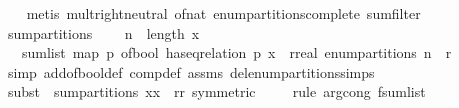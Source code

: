 \begin{isabellebody}
%
\isadelimproof
\ \ %
\endisadelimproof
%
\isatagproof
{}\isamarkupfalse%
\ {\isacharparenleft}{\kern0pt}metis\ mult{\isachardot}{\kern0pt}right{\isacharunderscore}{\kern0pt}neutral\ of{\isacharunderscore}{\kern0pt}nat{\isacharunderscore}{\kern0pt}{}\ enum{\isacharunderscore}{\kern0pt}partitions{\isacharunderscore}{\kern0pt}complete\ sum{\isacharunderscore}{\kern0pt}filter{\isacharparenright}{\kern0pt}%
\endisatagproof
{\isafoldproof}%
%
\isadelimproof
\isanewline
%
\endisadelimproof
\isanewline
{}\isamarkupfalse%
\ sum{\isacharunderscore}{\kern0pt}partitions{\isacharprime}{\kern0pt}{\isacharcolon}{\kern0pt}\ \isanewline
\ \ \ {\isachardoublequoteopen}n\ {\isacharequal}{\kern0pt}\ length\ x{\isachardoublequoteclose}\isanewline
\ \ \ {\isachardoublequoteopen}sum{\isacharunderscore}{\kern0pt}list\ {\isacharparenleft}{\kern0pt}map\ {\isacharparenleft}{\kern0pt}{\isasymlambda}p{\isachardot}{\kern0pt}\ of{\isacharunderscore}{\kern0pt}bool\ {\isacharparenleft}{\kern0pt}has{\isacharunderscore}{\kern0pt}eq{\isacharunderscore}{\kern0pt}relation\ p\ x{\isacharparenright}{\kern0pt}\ {\isacharasterisk}{\kern0pt}\ {\isacharparenleft}{\kern0pt}r{\isacharcolon}{\kern0pt}{\isacharcolon}{\kern0pt}real{\isacharparenright}{\kern0pt}{\isacharparenright}{\kern0pt}\ {\isacharparenleft}{\kern0pt}enum{\isacharunderscore}{\kern0pt}partitions\ n{\isacharparenright}{\kern0pt}{\isacharparenright}{\kern0pt}\ {\isacharequal}{\kern0pt}\ r{\isachardoublequoteclose}\isanewline
%
\isadelimproof
\ \ %
\endisadelimproof
%
\isatagproof
{}\isamarkupfalse%
\ {\isacharparenleft}{\kern0pt}simp\ add{\isacharcolon}{\kern0pt}of{\isacharunderscore}{\kern0pt}bool{\isacharunderscore}{\kern0pt}def\ comp{\isacharunderscore}{\kern0pt}def\ assms\ del{\isacharcolon}{\kern0pt}enum{\isacharunderscore}{\kern0pt}partitions{\isachardot}{\kern0pt}simps{\isacharparenright}{\kern0pt}\isanewline
\ \ \isamarkupfalse%
\ {\isacharparenleft}{\kern0pt}subst\ {\isacharparenleft}{\kern0pt}{}{\isacharparenright}{\kern0pt}\ sum{\isacharunderscore}{\kern0pt}partitions{\isacharbrackleft}{\kern0pt}\ x{\isacharequal}{\kern0pt}{\isachardoublequoteopen}x{\isachardoublequoteclose}\ \ r{\isacharequal}{\kern0pt}{\isachardoublequoteopen}r{\isachardoublequoteclose}{\isacharcomma}{\kern0pt}\ symmetric{\isacharbrackright}{\kern0pt}{\isacharparenright}{\kern0pt}\ \isanewline
\ \ \isamarkupfalse%
\ {\isacharparenleft}{\kern0pt}rule\ arg{\isacharunderscore}{\kern0pt}cong{\isacharbrackleft}{\kern0pt}\ f{\isacharequal}{\kern0pt}{\isachardoublequoteopen}sum{\isacharunderscore}{\kern0pt}list{\isachardoublequoteclose}{\isacharbrackright}{\kern0pt}{\isacharparenright}{\kern0pt}\isanewline

\end{isabellebody}
